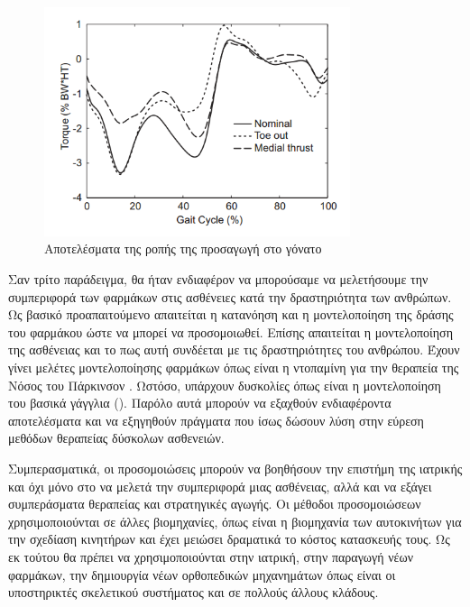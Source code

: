 \begin{figure}[H]
    \centering
    \includegraphics[width=0.8\textwidth, keepaspectratio]{fig/knee-load.png}
    \caption{Αποτελέσματα της ροπής της προσαγωγή στο γόνατο \cite{fregly07}}
    \label{fig:knee-load}
\end{figure}

Σαν τρίτο παράδειγμα, θα ήταν ενδιαφέρον να μπορούσαμε να μελετήσουμε την συμπεριφορά των φαρμάκων στις ασθένειες κατά την δραστηριότητα των ανθρώπων. Ως βασικό προαπαιτούμενο απαιτείται η κατανόηση και η μοντελοποίηση της δράσης του φαρμάκου ώστε να μπορεί να προσομοιωθεί. Επίσης απαιτείται η μοντελοποίηση της ασθένειας και το πως αυτή συνδέεται με τις δραστηριότητες του ανθρώπου. Έχουν γίνει μελέτες μοντελοποίησης φαρμάκων όπως είναι η ντοπαμίνη για την θεραπεία της Νόσος του Πάρκινσον \cite{haeri05}. Ωστόσο, υπάρχουν δυσκολίες όπως είναι η μοντελοποίηση του βασικά γάγγλια (). Παρόλο αυτά μπορούν να εξαχθούν ενδιαφέροντα αποτελέσματα και να εξηγηθούν πράγματα που ίσως δώσουν λύση στην εύρεση μεθόδων θεραπείας δύσκολων ασθενειών.

Συμπερασματικά, οι προσομοιώσεις μπορούν να βοηθήσουν την επιστήμη της ιατρικής και όχι μόνο στο να μελετά την συμπεριφορά μιας ασθένειας, αλλά και να εξάγει συμπεράσματα θεραπείας και στρατηγικές αγωγής. Οι μέθοδοι προσομοιώσεων χρησιμοποιούνται σε άλλες βιομηχανίες, όπως είναι η βιομηχανία των αυτοκινήτων για την σχεδίαση κινητήρων και έχει μειώσει δραματικά το κόστος κατασκευής τους. Ως εκ τούτου θα πρέπει να χρησιμοποιούνται στην ιατρική, στην παραγωγή νέων φαρμάκων, την δημιουργία νέων ορθοπεδικών μηχανημάτων όπως είναι οι υποστηρικτές σκελετικού συστήματος \cite{stopforth12} και σε πολλούς άλλους κλάδους.

